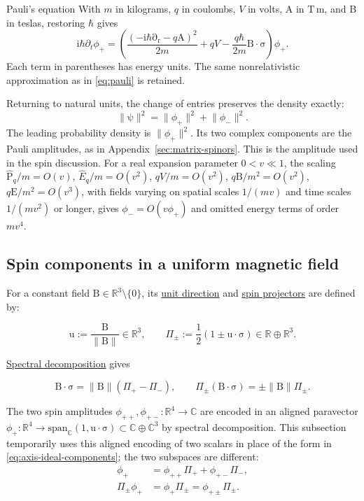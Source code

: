 \documentclass[11pt]{article}
\newcommand{\pvGreek}[1]{{#1}}
\newcommand{\vstyle}[1]{{\bm{\mathrm{#1}}}}
\newcommand{\pvPi}{\pvGreek{\Pi}}
\newcommand{\pvphi}{\pvGreek{\phi}}
\numberwithin{equation}{section}
\newcommand{\R}{\mathbb{R}}
\newcommand{\C}{\mathbb{C}}
\newcommand{\ii}{\mathrm{i}}
\newcommand{\dotprod}{\cdot}
\newcommand{\bsig}{\vstyle{\sigma}}
\newcommand{\bA}{\vstyle{A}}
\newcommand{\br}{\vstyle{r}}
\newcommand{\bE}{\vstyle{E}}
\newcommand{\bBf}{\vstyle{B}}
\newcommand{\bp}{\vstyle{P}}
\newcommand{\bpsi}{\vstyle{\psi}}
\newcommand{\hEq}{\hat E_q}
\newcommand{\hbpq}{\hat{\bp}_q}
\newcommand{\pdr}{\vstyle{\partial}_{\br}}
\begin{document}
\begin{SIunits}{Pauli's equation}
With $m$ in kilograms, $q$ in coulombs, $V$ in volts, $\bA$ in
$\mathrm{T\,m}$, and $\bBf$ in teslas, restoring $\hbar$ gives
\[
 \ii\hbar\partial_t\pvphi_+
 =\left(\frac{(-\ii\hbar\pdr-q\bA)^2}{2m}+qV
 -\frac{q\hbar}{2m}\bBf\dotprod\bsig\right)\pvphi_+.
\]
Each term in parentheses has energy units. The same nonrelativistic
approximation as in \eqref{eq:pauli} is retained.
\end{SIunits}

Returning to natural units, the change of entries preserves the density exactly:
\begin{equation*}
 \lVert\bpsi\rVert^2=\lVert\pvphi_+\rVert^2+\lVert\pvphi_-\rVert^2.
\end{equation*}
The leading probability density is $\lVert\pvphi_+\rVert^2$.
Its two complex components are the Pauli amplitudes, as in
Appendix~\ref{sec:matrix-spinors}. This is the amplitude used in the spin discussion.
For a real expansion parameter $0<v\ll1$, the scaling $\hbpq/m=O(v)$, $\hEq/m=O(v^2)$,
$qV/m=O(v^2)$, $q\bBf/m^2=O(v^2)$, $q\bE/m^2=O(v^3)$,
with fields varying on spatial scales $1/(mv)$ and time scales $1/(mv^2)$
or longer, gives $\pvphi_-=O(v\pvphi_+)$ and omitted energy terms of order $mv^4$.

\subsection{Spin components in a uniform magnetic field}
\label{sec:uniform-spin}

For a constant field $\vstyle{B}\in\R^3\setminus\{0\}$, its \hyperref[def:real-unit-vector]{unit direction} and \hyperref[sec:algebra-projectors]{spin projectors} are defined by:

\[
\vstyle{u}:=\frac{\vstyle{B}}{\lVert\vstyle{B}\rVert}\in\R^3,
\qquad \pvPi_\pm:=\frac12(1\pm\vstyle{u}\dotprod\bsig)\in\R\oplus\R^3.
\]

\hyperref[sec:spectral]{Spectral decomposition} gives

\[
\vstyle{B}\dotprod\bsig
=\lVert\vstyle{B}\rVert(\pvPi_+-\pvPi_-),
\qquad
\pvPi_\pm(\vstyle{B}\dotprod\bsig)
=\pm\lVert\vstyle{B}\rVert\pvPi_\pm.
\]

The two spin amplitudes $\phi_{++},\phi_{+-}:\R^4\to\C$ are encoded in an aligned paravector
$\pvphi_+:\R^4\to\mathrm{span}_{\C}(1,\vstyle{u}\dotprod\bsig)\subset\C\oplus\C^3$
by spectral decomposition. This subsection temporarily uses this aligned
encoding of two scalars in place of the form in \eqref{eq:axis-ideal-components};
the two subspaces are different:
\[
\begin{aligned}
\pvphi_+&=\phi_{++}\pvPi_++\phi_{+-}\pvPi_-,\\
\pvPi_\pm\pvphi_+&=\pvphi_+\pvPi_\pm=\phi_{+\pm}\pvPi_\pm.
\end{aligned}
\]
\end{document}
